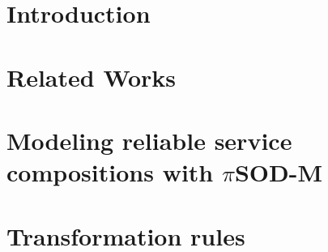\documentclass[preprint,12pt]{elsarticle}
\theoremstyle{plain}
\theoremstyle{plain}
\theoremstyle{plain}
\theoremstyle{plain}
\newcommand{\pisodm}[0]{$\pi$SOD-M\xspace}
\begin{document}

\section{Introduction}
\label{sec:intro}


\section{Related Works}
\label{sec:relworks}


%

%

%

\section{Modeling reliable service compositions with \pisodm}\label{sec:motivation}



\section{Transformation rules}\label{sec:mmrules}

\end{document}
